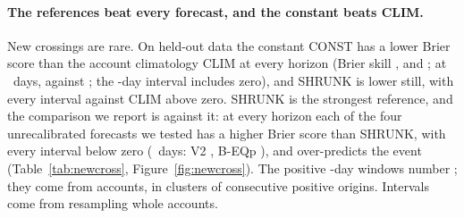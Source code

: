 \paragraph{The references beat every forecast, and the constant beats
CLIM.} New crossings are rare. On held-out data the constant CONST has a
lower Brier score than the account climatology CLIM at every horizon
(Brier skill ,
 and ;
at \hC\ days,  against ;
the \hB-day interval includes zero),
and SHRUNK is lower still, with every interval against CLIM above zero.
SHRUNK is the strongest reference, and the comparison we report is
against it: at every horizon each of the four unrecalibrated forecasts we
tested has a higher Brier score than SHRUNK, with every interval below
zero (\hC\ days: V2 , B-EQp
), and over-predicts the event
(Table~\ref{tab:newcross}, Figure~\ref{fig:newcross}). The positive
\hC-day windows number ; they come from
 accounts, in
 clusters of consecutive positive
origins. Intervals come from resampling whole accounts.

